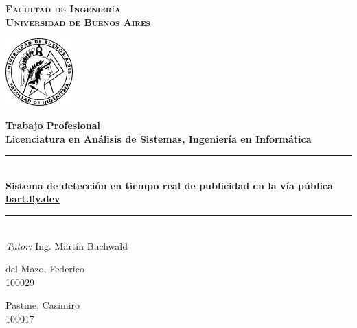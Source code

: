 \documentclass[a4paper]{article}
\begin{document}
\begin{titlepage}

    \centering
    \hfill
    \begin{minipage}{0.7\textwidth}
            \centering
            \LARGE
            \textsc{\textbf{Facultad de Ingeniería}}\\[0.1cm]
            \textsc{\textbf{Universidad de Buenos Aires}}
        \end{minipage}%
        \begin{minipage}{2.6cm}
            \centering
            \includegraphics[width=2.6cm]{./img/fiuba.png}
        \end{minipage}

    \vspace{3cm}
    \huge \bfseries Trabajo Profesional \\
    \LARGE \bfseries Licenciatura en Análisis de Sistemas, Ingeniería en Informática
    \vspace{2cm}

    \rule{\linewidth}{0.3mm} \\[0.1cm]
    \huge \bfseries Sistema de detección en tiempo real de publicidad en la vía pública\\
    \vspace{0.1cm}
    \small\href{https://bart.fly.dev}{bart.fly.dev}
    \rule{\linewidth}{0.3mm}\\[0.7cm]

    \large \emph{Tutor:} Ing. Martín Buchwald\\[0.6cm]
    \begin{minipage}{0.4\textwidth}
        \begin{flushleft}
            \centering
            \large del Mazo, Federico \\
            100029
        \end{flushleft}
    \end{minipage}
    \begin{minipage}{0.4\textwidth}
        \begin{flushright}
            \centering
            \large Pastine, Casimiro \\
            100017
        \end{flushright}
    \end{minipage}

\end{titlepage}
\end{document}
